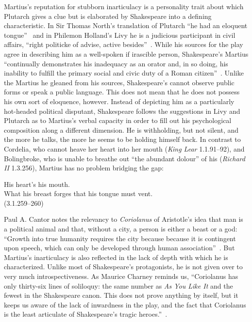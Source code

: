 Martius's reputation for stubborn inarticulacy is a personality trait about which Plutarch gives a clue but is elaborated by Shakespeare into a defining characteristic.
In Sir Thomas North's translation of Plutarch ``he had an eloquent tongue''~\cite[5:543]{bullough_narrative_1957} and in Philemon Holland's Livy he is a judicious participant in civil affairs, ``right politicke of advise, active besides''~\cite[5:498]{bullough_narrative_1957}.
While his sources for the play agree in describing him as a well-spoken if irascible person, Shakespeare's Martius ``continually demonstrates his inadequacy as an orator and, in so doing, his inability to fulfill the primary social and civic duty of a Roman citizen''~\cite[185]{miola_shakespeares_1983}.
Unlike the Martius he gleaned from his sources, Shakespeare's cannot observe public forms or speak a public language.
This does not mean that he does not possess his own sort of eloquence, however.
Instead of depicting him as a particularly hot-headed political disputant, Shakespeare follows the suggestions in Livy and Plutarch as to Martius's verbal capacity in order to fill out his psychological composition along a different dimension.
He is withholding, but not silent, and the more he talks, the more he seems to be holding himself back.
In contrast to Cordelia, who cannot heave her heart into her mouth (\emph{King Lear} 1.1.91--92), and Bolingbroke, who is unable to breathe out ``the abundant dolour'' of his (\emph{Richard II} 1.3.256), Martius has no problem bridging the gap:
\begin{vq}
His heart's his mouth.\\
What his breast forges that his tongue must vent.\\
\hfill(3.1.259--260)
\end{vq}
Paul A. Cantor notes the relevancy to \emph{Coriolanus} of Aristotle's idea that man is a political animal and that, without a city, a person is either a beast or a god: ``Growth into true humanity requires the city because because it is contingent upon speech, which can only be developed through human association''~\cite[101]{cantor_shakespeares_1976}.
But Martius's inarticulacy is also reflected in the lack of depth with which he is characterized.
Unlike most of Shakespeare's protagonists, he is not given over to very much introspectiveness.
As Maurice Charney reminds us, ``Coriolanus has only thirty-six lines of soliloquy: the same number as \emph{As You Like It} and the fewest in the Shakespeare canon.
This does not prove anything by itself, but it keeps us aware of the lack of inwardness in the play, and the fact that Coriolanus is the least articulate of Shakespeare's tragic heroes.''~\cite[79]{charney_dramatic_1970}.
